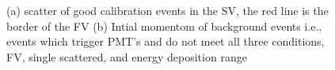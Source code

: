 \begin{figure}
   \centering
    \begin{minipage}[b]{0.49\textwidth}
    \end{minipage}
    \begin{minipage}[b]{0.4\textwidth}
    \end{minipage} 
    \caption{(a) scatter of good calibration events in the SV, the red line is the border of the FV  (b) Intial momentom of background events i.e., events which trigger PMT's and do not meet all three conditions, FV, single scattered, and energy deposition range \label{fig:IBelt}
}
\end{figure}



